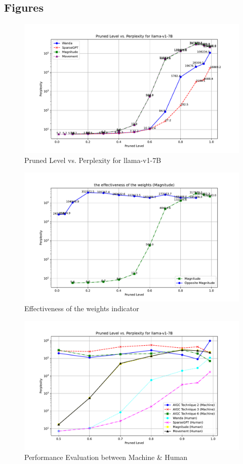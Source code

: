 \documentclass{article} %
\begin{document}
\subsection{Figures}
\begin{figure}[h]
\begin{center}
\includegraphics[width=0.8\linewidth]{fig1.pdf} 
\end{center}
\caption{Pruned Level vs. Perplexity for llama-v1-7B}
\label{fig:fig1} 
\end{figure}

\begin{figure}[h]
\begin{center}
\includegraphics[width=0.8\linewidth]{fig2.pdf} 
\end{center}
\caption{Effectiveness of the weights indicator}
\label{fig:fig2} 
\end{figure}

\begin{figure}[h]
\begin{center}
\includegraphics[width=0.8\linewidth]{fig3.pdf} 
\end{center}
\caption{Performance Evaluation between Machine \& Human}
\label{fig:fig3} 
\end{figure}
\end{document}
